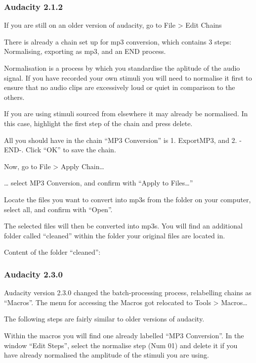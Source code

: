 \documentclass[]{book}
\begin{document}
\subsubsection{Audacity 2.1.2}\label{audacity-2.1.2}

If you are still on an older version of audacity, go to File
\textgreater{} Edit Chains

There is already a chain set up for mp3 conversion, which contains 3
steps: Normalising, exporting as mp3, and an END process.

Normalisation is a process by which you standardise the aplitude of the
audio signal. If you have recorded your own stimuli you will need to
normalise it first to ensure that no audio clips are excessively loud or
quiet in comparison to the others.

If you are using stimuli sourced from elsewhere it may already be
normalised. In this case, highlight the first step of the chain and
press delete.

All you should have in the chain ``MP3 Conversion'' is 1. ExportMP3, and
2. -END-. Click ``OK'' to save the chain.

Now, go to File \textgreater{} Apply Chain\ldots{}

\ldots{} select MP3 Conversion, and confirm with ``Apply to
Files\ldots{}''

Locate the files you want to convert into mp3s from the folder on your
computer, select all, and confirm with ``Open''.

The selected files will then be converted into mp3s. You will find an
additional folder called ``cleaned'' within the folder your original
files are located in.

Content of the folder ``cleaned'':

\subsubsection{Audacity 2.3.0}\label{audacity-2.3.0}

Audacity version 2.3.0 changed the batch-processing process, relabelling
chains as ``Macros''. The menu for accessing the Macros got relocated to
Tools \textgreater{} Macros\ldots{}

The following steps are fairly similar to older versions of audacity.

Within the macros you will find one already labelled ``MP3 Conversion''.
In the window ``Edit Steps'', select the normalise step (Num 01) and
delete it if you have already normalised the amplitude of the stimuli
you are using.
\end{document}
